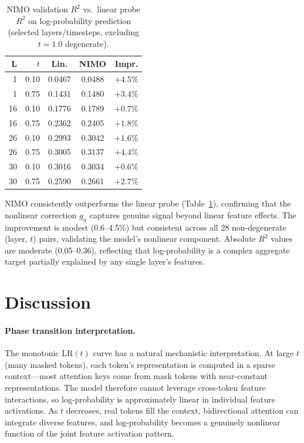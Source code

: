 \documentclass{article}
\begin{document}
\begin{table}[t]
\centering
\caption{NIMO validation $R^2$ vs.\ linear probe $R^2$ on log-probability prediction (selected layers/timesteps, excluding $t = 1.0$ degenerate).}
\label{tab:r2}
\vskip 0.1in
\begin{small}
\begin{sc}
\begin{tabular}{rr cc r}
\toprule
\textbf{L} & $t$ & \textbf{Lin.} & \textbf{NIMO} & \textbf{Impr.} \\
\midrule
1  & 0.10 & 0.0467 & 0.0488 & $+4.5\%$ \\
1  & 0.75 & 0.1431 & 0.1480 & $+3.4\%$ \\
16 & 0.10 & 0.1776 & 0.1789 & $+0.7\%$ \\
16 & 0.75 & 0.2362 & 0.2405 & $+1.8\%$ \\
26 & 0.10 & 0.2993 & 0.3042 & $+1.6\%$ \\
26 & 0.75 & 0.3005 & 0.3137 & $+4.4\%$ \\
30 & 0.10 & 0.3016 & 0.3034 & $+0.6\%$ \\
30 & 0.75 & 0.2590 & 0.2661 & $+2.7\%$ \\
\bottomrule
\end{tabular}
\end{sc}
\end{small}
\end{table}

NIMO consistently outperforms the linear probe (Table~\ref{tab:r2}), confirming that the nonlinear correction $g_u$ captures genuine signal beyond linear feature effects.
The improvement is modest (0.6--4.5\%) but consistent across all 28 non-degenerate (layer, $t$) pairs, validating the model's nonlinear component.
Absolute $R^2$ values are moderate (0.05--0.36), reflecting that log-probability is a complex aggregate target partially explained by any single layer's features.

\section{Discussion}

\paragraph{Phase transition interpretation.}
The monotonic LR$(t)$ curve has a natural mechanistic interpretation. At large $t$ (many masked tokens), each token's representation is computed in a sparse context---most attention keys come from mask tokens with near-constant representations. The model therefore cannot leverage cross-token feature interactions, so log-probability is approximately linear in individual feature activations. As $t$ decreases, real tokens fill the context, bidirectional attention can integrate diverse features, and log-probability becomes a genuinely nonlinear function of the joint feature activation pattern.
\end{document}
